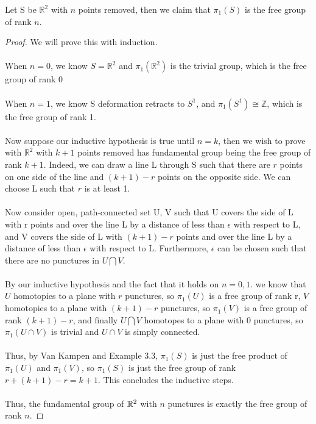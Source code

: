 \begin{example}
Let S be $\mathbb{R}^2$ with $n$ points removed, then we claim that $\pi_1(S)$ is the free group of rank $n$.
\begin{proof}
We will prove this with induction.\\\\
When $n = 0$, we know $S = \mathbb{R}^2$ and $\pi_1(\mathbb{R}^2)$ is the trivial group, which is the free group of rank 0\\\\
When $n = 1$, we know S deformation retracts to $S^1$, and $\pi_1(S^1) \cong \mathbb{Z}$, which is the free group of rank 1.\\\\
Now suppose our inductive hypothesis is true until $n = k$, then we wish to prove with $\mathbb{R}^2$ with $k+1$ points removed has fundamental group being the free group of rank $k+1$. Indeed, we can draw a line L through S such that there are $r$ points on one side of the line and $(k + 1) - r$ points on the opposite side. We can choose L such that $r$ is at least 1.\\\\
Now consider open, path-connected set U, V such that U covers the side of L with r points and over the line L by a distance of less than $\epsilon$ with respect to L, and V covers the side of L with $(k+1)-r$ points and over the line L by a distance of less than $\epsilon$ with respect to L. Furthermore, $\epsilon$ can be chosen such that there are no punctures in $U \bigcap V$.\\\\
By our inductive hypothesis and the fact that it holds on $n = 0, 1$. we know that $U$ homotopies to a plane with $r$ punctures, so $\pi_1(U)$ is a free group of rank r, $V$ homotopies to a plane with $(k+1)-r$ punctures, so $\pi_1(V)$ is a free group of rank $(k+1)-r$, and finally $U \bigcap V$ homotopes to a plane with 0 punctures, so $\pi_1(U \cap V)$ is trivial and $U \cap V$ is simply connected.\\\\
Thus, by Van Kampen and Example 3.3, $\pi_1(S)$ is just the free product of $\pi_1(U)$ and $\pi_1(V)$, so $\pi_1(S)$ is just the free group of rank $r + (k+1) - r = k+1$. This concludes the inductive steps.\\\\
Thus, the fundamental group of $\mathbb{R}^2$ with $n$ punctures is exactly the free group of rank $n$.
\end{proof}
\end{example}